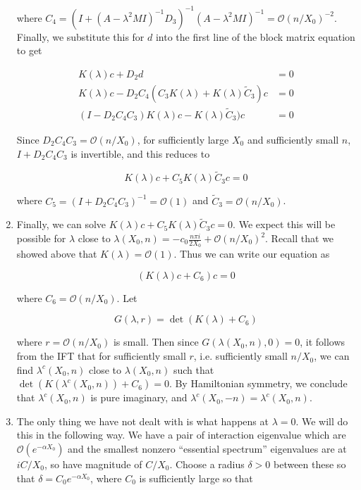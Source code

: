 \documentclass[12pt]{article}
\begin{document}
\begin{enumerate}
where $C_4 = (I + (A - \lambda^2 MI)^{-1} D_3)^{-1}(A - \lambda^2 MI)^{-1} = \mathcal{O}(n/X_0)^{-2}$.\\

Finally, we substitute this for $d$ into the first line of the block matrix equation to get

\begin{align*}
K(\lambda)c + D_2 d &= 0 \\
K(\lambda)c - D_2 C_4 (C_3 K(\lambda) + K(\lambda) \tilde{C}_3) c &= 0 \\
(I - D_2 C_4 C_3 ) K(\lambda)c - K(\lambda) \tilde{C}_3) c &= 0
\end{align*}

Since $D_2 C_4 C_3 = \mathcal{O}(n/X_0)$, for sufficiently large $X_0$ and sufficiently small $n$, $I + D_2 C_4 C_3$ is invertible, and this reduces to

\[
K(\lambda)c + C_5 K(\lambda) \tilde{C}_3 c = 0
\]

where $C_5 = (I + D_2 C_4 C_3)^{-1} = \mathcal{O}(1)$ and $\tilde{C}_3 = \mathcal{O}(n/X_0)$.

\item Finally, we can solve $K(\lambda)c + C_5 K(\lambda) \tilde{C}_3 c = 0$. We expect this will be possible for $\lambda$ close to $\lambda(X_0, n) = -c_0 \frac{n \pi i }{2 X_0} + \mathcal{O}(n/X_0)^2$. Recall that we showed above that $K(\lambda) = \mathcal{O}(1)$. Thus we can write our equation as

\[
(K(\lambda)c + C_6 ) c = 0
\]

where $C_6 = \mathcal{O}(n/X_0)$. Let

\[
G(\lambda, r) = \det( K(\lambda) + C_6 )
\]

where $r = \mathcal{O}(n/X_0)$ is small. Then since $G( \lambda(X_0, n), 0) = 0$, it follows from the IFT that for sufficiently small $r$, i.e. sufficiently small $n/X_0$, we can find $\lambda^c(X_0, n)$ close to $\lambda(X_0, n)$ such that $\det ( K(\lambda^c(X_0, n)) + C_6 ) = 0$. By Hamiltonian symmetry, we conclude that $\lambda^c(X_0, n)$ is pure imaginary, and $\lambda^c(X_0, -n) = \lambda^c(X_0, n)$.

\item The only thing we have not dealt with is what happens at $\lambda = 0$. We will do this in the following way. We have a pair of interaction eigenvalue which are $\mathcal{O}(e^{-\alpha X_0})$ and the smallest nonzero ``essential spectrum'' eigenvalues are at $i C/X_0$, so have magnitude of $C/X_0$. Choose a radius $\delta > 0$ between these so that $\delta = C_0 e^{-\alpha X_0}$, where $C_0$ is sufficiently large so that


\end{enumerate}
\end{document}

